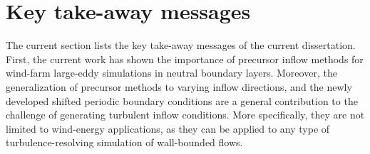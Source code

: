 %
%
%

\section{Key take-away messages}\label{sec:conc_key}
The current section lists the key take-away messages of the current dissertation. First, the current work has shown the importance of precursor inflow methods for wind-farm large-eddy simulations in neutral boundary layers. Moreover, the generalization of precursor methods to varying inflow directions, and the newly developed shifted periodic boundary conditions are a general contribution to the challenge of generating turbulent inflow conditions. More specifically, they are not limited to wind-energy applications, as they can be applied to any type of turbulence-resolving simulation of wall-bounded flows.

